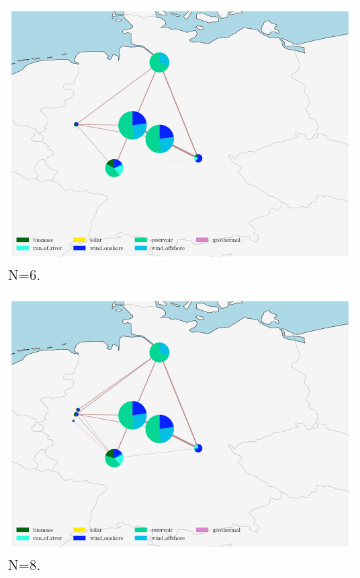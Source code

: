 \begin{figure}[H]
\centering
\begin{subfigure}[c]{0.5\linewidth}
\includegraphics[width=\linewidth]{Figures/eGo100_No4.pdf} 
\caption{N=6.}
\label{fig:3a}
\end{subfigure}\hfill    
\begin{subfigure}[c]{0.5\linewidth}
\includegraphics[width=\linewidth]{Figures/eGo100_No5.pdf}
\caption{N=8.}
\label{fig:3b}
\end{subfigure}
\begin{subfigure}[c]{0.5\linewidth}

\end{subfigure}
\end{figure}
